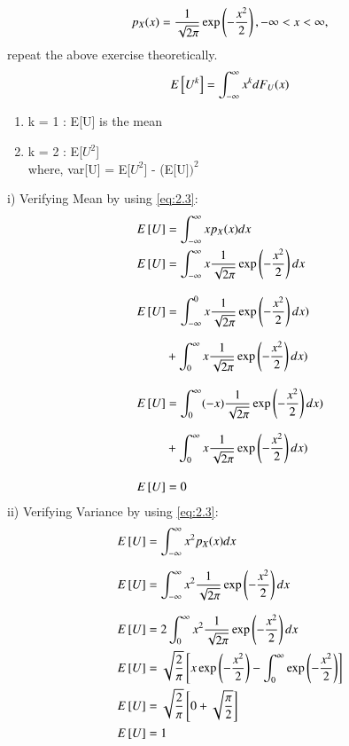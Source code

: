 \documentclass[journal,12pt,twocolumn]{IEEEtran}
\renewcommand\thesection{\arabic{section}}
\begin{document}
\begin{enumerate}[label=\thesection.\arabic*
,ref=\thesection.\theenumi]
\begin{align}
p_{X}(x) = \frac{1}{\sqrt{2\pi}}\exp\left(-\frac{x^2}{2}\right), -\infty < x < \infty,
\label{eq:2.3}
\end{align}
repeat the above exercise theoretically.
\solution \\
    \begin{equation*}
        E{}\left[U^k\right] = \int_{-\infty}^{\infty}x^kdF_{U}(x)\\
    \end{equation*}
\begin{enumerate}
    \item k = 1 : E[U] is the mean 
    \item k = 2 : E[$U^2$] \\[9pt]
    where, var[U] = E[$U^2$] - (E[U$])^2$\\
\end{enumerate}
i) Verifying Mean by using \eqref{eq:2.3}:
    \begin{align}
    E{}\left[U\right] &= \int_{-\infty}^{\infty}x p_X(x)dx\\
    E{}\left[U\right] &= \int_{-\infty}^{\infty} x \frac{1}{\sqrt{2\pi}}\exp\left(-\frac{x^2}{2}\right) dx \\[9pt]
    E{}\left[U\right] &= \int_{-\infty}^{0} x \frac{1}{\sqrt{2\pi}}\exp\left(-\frac{x^2}{2}\right) dx)\\[7pt]
    &+ \int_{0}^{\infty} x \frac{1}{\sqrt{2\pi}}\exp\left(-\frac{x^2}{2}\right) dx)\\[9pt]
    E{}\left[U\right] &= \int_{0}^{\infty} (-x) \frac{1}{\sqrt{2\pi}}\exp\left(-\frac{x^2}{2}\right) dx)\\[7pt]
    &+ \int_{0}^{\infty} x \frac{1}{\sqrt{2\pi}}\exp\left(-\frac{x^2}{2}\right) dx)\\[9pt]
    E{}\left[U\right] &= 0
    \end{align}
%
%
ii) Verifying Variance by using \eqref{eq:2.3}:
\begin{align}
     E{}\left[U\right] &= \int_{-\infty}^{\infty} x^2 p_X(x) dx\\[7pt]
     E{}\left[U\right] &= \int_{-\infty}^{\infty} x^2 \frac{1}{\sqrt{2\pi}}\exp\left(-\frac{x^2}{2}\right) dx \\[7pt]
     E{}\left[U\right] &= 2\int_{0}^{\infty} x^2 \frac{1}{\sqrt{2\pi}}\exp\left(-\frac{x^2}{2}\right) dx\\
     E{}\left[U\right] &= \sqrt{\frac{2}{\pi}}{}\left[x\exp\left({-\frac{x^2}{2}}\right)-\int_{0}^\infty \exp\left({-\frac{x^2}{2}}\right)\right]\\
     E{}\left[U\right] &= \sqrt{\frac{2}{\pi}}{}\left[0+\sqrt{\frac{\pi}{2}}\right]\\
     E{}\left[U\right] &= 1
     \end{align}
\end{enumerate}
\end{document}
